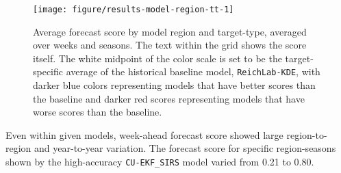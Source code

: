 \documentclass{article}\usepackage[]{graphicx}\usepackage[]{color}
\newenvironment{knitrout}{}{} %
\begin{document}
\begin{knitrout}
\color{fgcolor}\begin{figure}
\texttt{[image: figure/results-model-region-tt-1]} \caption[Average forecast score by model region and target-type, averaged over weeks and seasons]{Average forecast score by model region and target-type, averaged over weeks and seasons. The text within the grid shows the score itself. The white midpoint of the color scale is set to be the target-specific average of the historical baseline model, {\tt ReichLab-KDE}, with darker blue colors representing models that have better scores than the baseline and darker red scores representing models that have worse scores than the baseline.}\label{fig:results-model-region-tt}
\end{figure}


\end{knitrout}





Even within given models, week-ahead forecast score showed large region-to-region and year-to-year variation. 
The forecast score for specific region-seasons shown by the high-accuracy {\tt CU-EKF\_SIRS} model varied from 
0.21 to
0.80.

\end{document}
